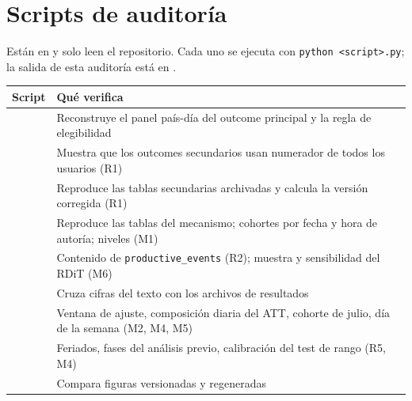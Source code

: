 \documentclass[11pt,a4paper]{article}
\newcommand{\cod}[1]{\texttt{#1}}
\begin{document}
\appendix
\section{Scripts de auditoría}

Están en  y solo leen el repositorio. Cada uno se ejecuta con
\cod{python <script>.py}; la salida de esta auditoría está en .

\begin{table}[h]
\small
\begin{tabularx}{\textwidth}{@{}L{5.3cm}Y@{}}
\toprule
Script & Qué verifica \\
\midrule
{} & Reconstruye el panel país-día del outcome principal y la regla de elegibilidad \\
 & Muestra que los outcomes secundarios usan numerador de todos los usuarios (R1) \\
 & Reproduce las tablas secundarias archivadas y calcula la versión corregida (R1) \\
 & Reproduce las tablas del mecanismo; cohortes por fecha y hora de autoría; niveles (M1) \\
 & Contenido de \cod{productive\_events} (R2); muestra y sensibilidad del RDiT (M6) \\
 & Cruza cifras del texto con los archivos de resultados \\
 & Ventana de ajuste, composición diaria del ATT, cohorte de julio, día de la semana (M2, M4, M5) \\
 & Feriados, fases del análisis previo, calibración del test de rango (R5, M4) \\
 & Compara figuras versionadas y regeneradas \\
\bottomrule
\end{tabularx}
\end{table}
\end{document}
